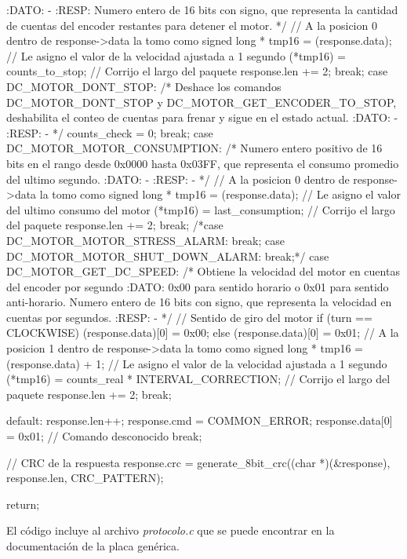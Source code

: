\documentclass[a4paper,10pt]{article}
\begin{document}
{\begin{verbatimtab}
{{			:DATO:
			-
			:RESP:
			Numero entero de 16 bits con signo, que representa la cantidad
			de cuentas del encoder restantes para detener el motor.
			*/
			// A la posicion 0 dentro de response->data la tomo como signed long *
			tmp16 = (response.data);
			// Le asigno el valor de la velocidad ajustada a 1 segundo
			(*tmp16) = counts_to_stop;
			// Corrijo el largo del paquete
			response.len += 2;
		break;
 		case DC_MOTOR_DONT_STOP:
			/* Deshace los comandos DC_MOTOR_DONT_STOP y DC_MOTOR_GET_ENCODER_TO_STOP, 
			deshabilita el conteo de cuentas para frenar y sigue en el estado actual.
			:DATO:
			-
			:RESP:
			-
			*/
			counts_check = 0;
		break;
 		case DC_MOTOR_MOTOR_CONSUMPTION:
			/* Numero entero positivo de 16 bits en el rango desde 0x0000 hasta
			0x03FF, que representa el consumo promedio del ultimo segundo.
			:DATO:
			-
			:RESP:
			-
			*/
			// A la posicion 0 dentro de response->data la tomo como signed long *
			tmp16 = (response.data);
			// Le asigno el valor del ultimo consumo del motor
			(*tmp16) = last_consumption;
			// Corrijo el largo del paquete
			response.len += 2;
		break;
 		/*case DC_MOTOR_MOTOR_STRESS_ALARM:
		break;
 		case DC_MOTOR_MOTOR_SHUT_DOWN_ALARM:
		break;*/
 		case DC_MOTOR_GET_DC_SPEED:
			/* Obtiene la velocidad del motor en cuentas del encoder por segundo
			:DATO:
			0x00 para sentido horario o 0x01 para sentido anti-horario. Numero
			entero de 16 bits con signo, que representa la velocidad en cuentas
			por segundos.
			:RESP:
			-
			*/
			// Sentido de giro del motor
			if (turn == CLOCKWISE)
			{
				(response.data)[0] = 0x00;
			} else {
				(response.data)[0] = 0x01;
			}
			// A la posicion 1 dentro de response->data la tomo como signed long *
			tmp16 = (response.data) + 1;
			// Le asigno el valor de la velocidad ajustada a 1 segundo
			(*tmp16) = counts_real * INTERVAL_CORRECTION;
			// Corrijo el largo del paquete
			response.len += 2;
		break;

		default:
			response.len++;
			response.cmd = COMMON_ERROR;
			response.data[0] = 0x01; // Comando desconocido
		break;
	}	

	// CRC de la respuesta
	response.crc = generate_8bit_crc((char *)(&response), response.len, CRC_PATTERN);

	return;
}
\end{verbatimtab}
}

El c\'odigo incluye al archivo \emph{protocolo.c} que se puede encontrar en la documentaci\'on de la placa gen\'erica.
\end{document}
